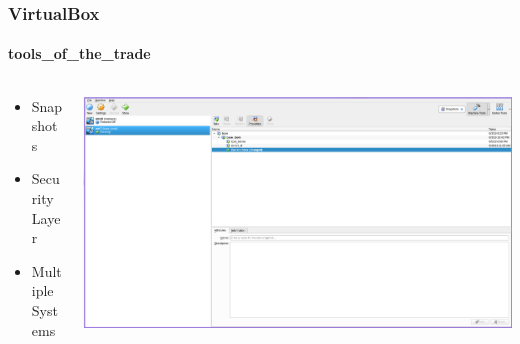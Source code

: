 \documentclass[aspectratio=169]{beamer}
\begin{document}
\begin{frame}
  \frametitle{VirtualBox}
  \framesubtitle{tools\_of\_the\_trade}
  \begin{columns}
    \begin{column}{.3\textwidth}
      \begin{itemize}
      \item{Snapshots}
      \item{Security Layer}
      \item{Multiple Systems}
      \end{itemize}
    \end{column}
    \hfill
    \begin{column}{.7\textwidth}
      \includegraphics[scale=0.6]{virtualbox}
    \end{column}
  \end{columns}
\end{frame}
\end{document}
